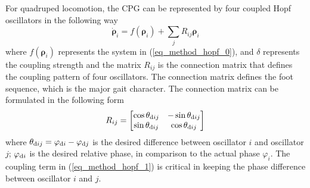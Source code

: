 \documentclass[letterpaper, 10 pt, journal, twoside]{IEEEtran} %
\begin{document}
For quadruped locomotion, the CPG can be represented by four coupled Hopf oscillators in the following way\cite{7090642}
\begin{equation}
	\label{eq_method_hopf_1}
	\dot{\boldsymbol{\rho}}_i
	=
	f\left(\boldsymbol{\rho}_i\right)
	+
	\sum_{j}{R_{ij}\boldsymbol{\rho}_i}
\end{equation}
where $f\left(\boldsymbol{\rho}_i\right)$ represents the system in (\ref{eq_method_hopf_0}), and $\delta$ represents the coupling strength and the matrix ${R}_{ij}$ is the connection matrix that defines the coupling pattern of four oscillators. The connection matrix defines the foot sequence, which is the major gait character. The connection matrix can be formulated in the following form
\begin{equation}
	{R}_{ij}=
	\begin{bmatrix}
		\cos \theta_{{\rm d}ij} & -\sin \theta_{{\rm d}ij} \\
		\sin \theta_{{\rm d}ij} & \cos \theta_{{\rm d}ij}
	\end{bmatrix}
\end{equation}
where $\theta_{{\rm d}ij}=\varphi_{{\rm d}i}-\varphi_{{\rm d}j}$ is the desired difference between oscillator $i$ and oscillator $j$; $\varphi_{{\rm d}i}$ is the desired relative phase, in comparison to the actual phase $\varphi_i$. The coupling term in (\ref{eq_method_hopf_1}) is critical in keeping the phase difference between oscillator $i$ and $j$. 
\end{document}
